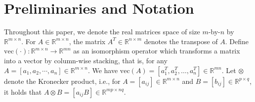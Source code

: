 \documentclass[11pt]{article}
\numberwithin{equation}{section}
\begin{document}




\section{Preliminaries and Notation} \label{PrelNotat}

Throughout this paper, we denote the real matrices space of size $m$-by-$n$ by $\mathbb{R}^{m\times n}$. For $A\in\mathbb{R}^{m\times n}$, the matrix $A^T\in\mathbb{R}^{n\times m}$ denotes the transpose of $A$. Define $\mathrm{vec}(\cdot): \mathbb{R}^{m\times n} \rightarrow \mathbb{R}^{mn}$ as an isomorphism operator which transforms a matrix into a vector by column-wise stacking, that is, for any $A=[a_1,a_2,\cdots,a_n]\in\mathbb{R}^{m\times n}$. We have $\mathrm{vec}(A)=[a_1^T,a_2^T,\dots,a_n^T]\in\mathbb{R}^{mn}$.
Let $\otimes$ denote the Kronecker product, i.e., for $A=[a_{ij}]\in \mathbb{R}^{m\times n}$ and $B=[b_{ij}]\in\mathbb{R}^{p\times q}$, it holds that $A\otimes B=[a_{ij}B]\in\mathbb{R}^{mp\times nq}$. 
%
\end{document}
